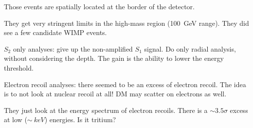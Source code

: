 \documentclass[main.tex]{subfiles}
\begin{document}
Those events are spatially located at the border of the detector. 

They get very stringent limits in the high-mass region (\SI{100}{GeV} range).
They did see a few candidate WIMP events. 

\(S_2 \) only analyses: give up the non-amplified \(S_1 \) signal. 
Do only radial analysis, without considering the depth.
The gain is the ability to lower the energy threshold. 

Electron recoil analyses: there seemed to be an excess of electron recoil. 
The idea is to not look at nuclear recoil at all! 
DM may scatter on electrons as well. 

They just look at the energy spectrum of electron recoils.  
There is a \(\sim 3.5 \sigma \) excess at low (\(\sim \SI{}{keV}\)) energies. Is it tritium? 
\end{document}
